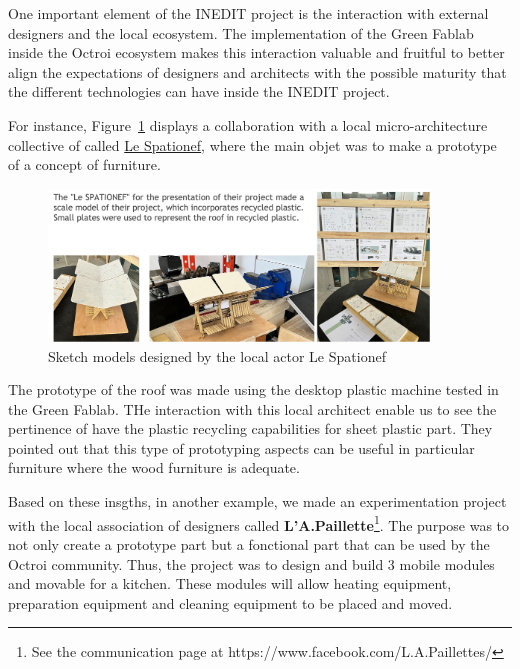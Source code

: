 \documentclass[
  11pt,
]{article}
\begin{document}
One important element of the INEDIT project is the interaction with
external designers and the local ecosystem. The implementation of the
Green Fablab inside the Octroi ecosystem makes this interaction valuable
and fruitful to better align the expectations of designers and
architects with the possible maturity that the different technologies
can have inside the INEDIT project.

For instance, Figure~\ref{fig-eddy} displays a collaboration with a
local micro-architecture collective of called
\href{https://www.octroi-nancy.fr/2020/10/29/collectif-hobo/}{Le
Spationef}, where the main objet was to make a prototype of a concept of
furniture.

\begin{figure}[H]

{\centering \includegraphics[width=0.9\textwidth,height=\textheight]{figures/demos/apa/eddy.jpg}

}

\caption{\label{fig-eddy}Sketch models designed by the local actor Le
Spationef}

\end{figure}

The prototype of the roof was made using the desktop plastic machine
tested in the Green Fablab. THe interaction with this local architect
enable us to see the pertinence of have the plastic recycling
capabilities for sheet plastic part. They pointed out that this type of
prototyping aspects can be useful in particular furniture where the wood
furniture is adequate.

Based on these insgths, in another example, we made an experimentation
project with the local association of designers called
\textbf{L'A.Paillette}\footnote{See the communication page at
  https://www.facebook.com/L.A.Paillettes/}. The purpose was to not only
create a prototype part but a fonctional part that can be used by the
Octroi community. Thus, the project was to design and build 3 mobile
modules and movable for a kitchen. These modules will allow heating
equipment, preparation equipment and cleaning equipment to be placed and
moved.
\end{document}
